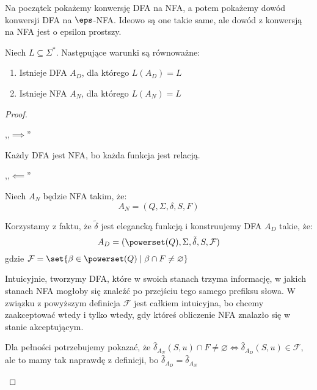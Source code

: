 Na początek pokażemy konwersję DFA na NFA, a potem pokażemy dowód konwersji DFA na \(\eps\)-NFA. Ideowo są one takie same, ale dowód z konwersją na NFA jest o epsilon prostszy.


\begin{theorem}
    Niech \( L \subseteq \Sigma^* \).
    Następujące warunki są równoważne:
    \begin{enumerate}
            \item Istnieje DFA \( A_D \), dla którego \( L(A_D) = L \)
        \item Istnieje NFA \( A_N \), dla którego \( L(A_N) = L \) 
    \end{enumerate}
\end{theorem}
\begin{proof} 
    \begin{description}
        \item ,,\( \implies \)''
        
        Każdy DFA jest NFA, bo każda funkcja jest relacją.
            
        \item ,,\( \impliedby \)''
        
        Niech \(A_N\) będzie NFA takim, że: 
        \[ A_N = (Q, \Sigma, \delta, S, F) \]
        
        Korzystamy z faktu, że \( \tilde \delta \) jest elegancką funkcją i konstruujemy DFA \(A_D\) takie, że:
        \[ A_D = (\powerset(Q), \Sigma, \tilde \delta, S, \mathcal{F}) \]
        gdzie \( \mathcal{F} = \set{\beta \in \powerset(Q) \mid \beta \cap F \neq \varnothing} \)
        
        Intuicyjnie, tworzymy DFA, które w swoich stanach trzyma informację, w jakich stanach NFA mogłoby się znaleźć po przejściu tego samego prefiksu słowa. W związku z powyższym definicja \( \mathcal{F} \) jest całkiem intuicyjna, bo chcemy zaakceptować wtedy i tylko wtedy, gdy któreś obliczenie NFA znalazło się w stanie akceptującym.  
        
        Dla pełności potrzebujemy pokazać, że \( \hat \delta_{A_N}(S, u) \cap F \neq \varnothing \iff \hat \delta_{A_D}(S, u) \in \mathcal{F} \),
        ale to mamy tak naprawdę z definicji, bo \( \hat \delta_{A_D} = \hat \delta_{A_N} \)
    \end{description}
\end{proof}

